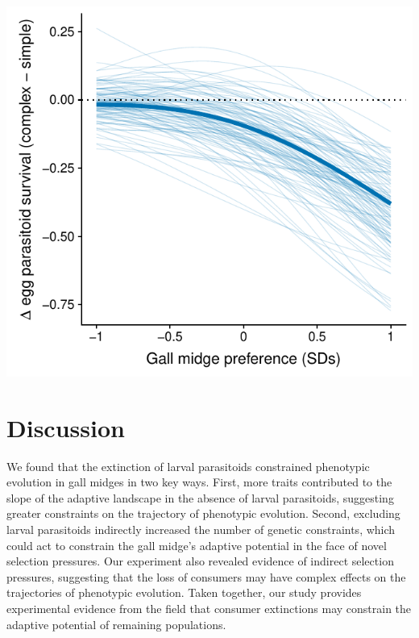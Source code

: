 \documentclass[11pt,]{article}
\let\origfigure\figure
\let\endorigfigure\endfigure
\renewenvironment{figure}[1][2] {
    \expandafter\origfigure\expandafter[H]
} {
    \endorigfigure
}
\begin{document}
\begin{figure}
\centering
\includegraphics{analyses/selection_on_Platygaster.pdf}
\caption{\label{fig:EggPtoid_Selection}Selection imposed by larval
parasitoids on egg parasitoids (\emph{Platygaster} sp.). The bold line
represents the average difference in the probability of observing the
egg parasitoid (original - extinction of larval parastioids) as a
function of gall midge oviposition preference. Thin lines represent
bootstrapped replicates to show the uncertainty in selection. For
clarity, we only display 100 bootstraps even though inferences are based
on 1,000 replicates. The decrease in the probability of observing egg
parasitoids at high gall-midge densities indicate that larval
parasitoids impose nonlinear selection on egg parasitoids.}
\end{figure}

\section{Discussion}\label{discussion}

We found that the extinction of larval parasitoids constrained
phenotypic evolution in gall midges in two key ways. First, more traits
contributed to the slope of the adaptive landscape in the absence of
larval parasitoids, suggesting greater constraints on the trajectory of
phenotypic evolution. Second, excluding larval parasitoids indirectly
increased the number of genetic constraints, which could act to
constrain the gall midge's adaptive potential in the face of novel
selection pressures. Our experiment also revealed evidence of indirect
selection pressures, suggesting that the loss of consumers may have
complex effects on the trajectories of phenotypic evolution. Taken
together, our study provides experimental evidence from the field that
consumer extinctions may constrain the adaptive potential of remaining
populations.
\end{document}
